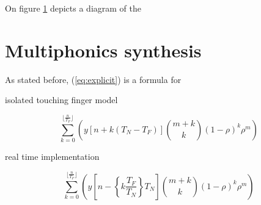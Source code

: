 \documentclass{sigchi}
\begin{document}
\begin{figure}[h]
	\centering
	\scalebox{1}{}
	\caption{}
	\label{fig:triangle}
\end{figure}

On figure \ref{fig:triangle} depicts a diagram of the

\section{Multiphonics synthesis}
As stated before, (\ref{eq:explicit}) is a formula for

isolated touching finger model

\begin{equation}
	\sum_{k=0}^{\lfloor \frac{n}{T_F} \rfloor}\left(y[n + k(T_N-T_F)]\binom{m+k}{k} (1 - \rho)^{k} \rho^m\right)
\end{equation}

% 

real time implementation

\begin{equation}
	\sum_{k=0}^{\lfloor \frac{n}{T_F} \rfloor}\left(y[n - \left\{ k\frac{T_F}{T_N}\right\} T_N] \binom{m+k}{k} (1 - \rho)^{k} \rho^m\right)
\end{equation}





\end{document}
